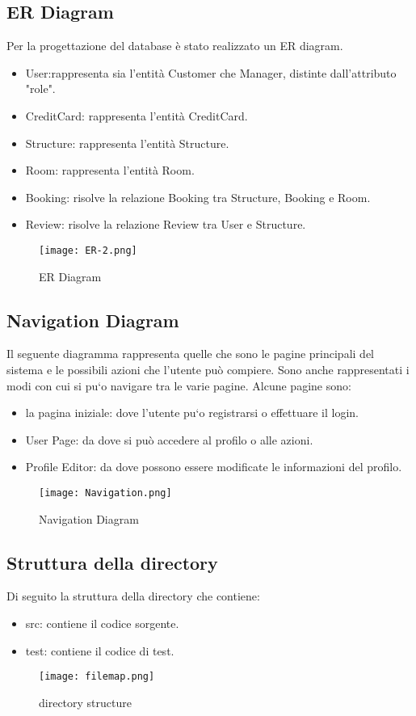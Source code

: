 \documentclass{article}
\begin{document}
\subsection{ER Diagram}
Per la progettazione del database è stato realizzato un ER diagram.
\begin{itemize}
    \item User:rappresenta sia l'entità Customer che Manager, distinte dall'attributo "role".
    \item CreditCard: rappresenta l'entità CreditCard.
    \item Structure: rappresenta l'entità Structure.
    \item Room: rappresenta l'entità Room.
    \item Booking: risolve la relazione Booking tra Structure, Booking e Room.
    \item Review: risolve la relazione Review tra User e Structure.
\end{itemize}
\begin{figure}[h!]
    \centering
    \texttt{[image: ER-2.png]}
    \caption{ER Diagram}
    \label{fig:ER-Diagram}
\end{figure}
\newpage
\subsection{Navigation Diagram}
Il seguente diagramma rappresenta quelle che sono le pagine principali del sistema e le possibili azioni che l'utente può compiere. Sono anche rappresentati i modi con cui si pu`o navigare tra le varie pagine.\newline
Alcune pagine sono:
\begin{itemize}
    \item la pagina iniziale: dove l’utente pu`o registrarsi o effettuare il login.
    \item User Page: da dove si può accedere al profilo o alle azioni.
    \item Profile Editor: da dove possono essere modificate le informazioni del profilo.
\end{itemize}
\begin{figure}[h!]
    \centering
    \texttt{[image: Navigation.png]}
    \caption{Navigation Diagram}
    \label{fig:Navigation Diagram}
\end{figure}
\newpage
\subsection{Struttura della directory}
Di seguito la struttura della directory che contiene:
\begin{itemize}
    \item src: contiene il codice sorgente.
    \item test: contiene il codice di test.
\end{itemize}
\begin{figure}[h!]
    \centering
    \texttt{[image: filemap.png]}
    \caption{directory structure}
    \label{fig:directory structure}
\end{figure}
\newpage
\end{document}
